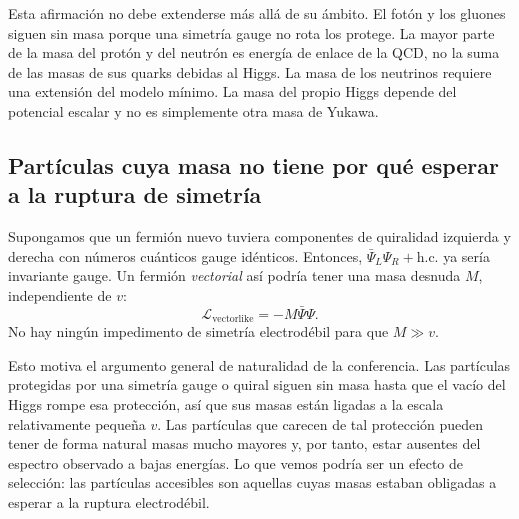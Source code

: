 Esta afirmación no debe extenderse más allá de su ámbito. El fotón y los gluones siguen sin masa porque una simetría gauge no rota los protege. La mayor parte de la masa del protón y del neutrón es energía de enlace de la QCD, no la suma de las masas de sus quarks debidas al Higgs. La masa de los neutrinos requiere una extensión del modelo mínimo. La masa del propio Higgs depende del potencial escalar y no es simplemente otra masa de Yukawa.

\subsection{Partículas cuya masa no tiene por qué esperar a la ruptura de simetría}

Supongamos que un fermión nuevo tuviera componentes de quiralidad izquierda y derecha con números cuánticos gauge idénticos. Entonces,
\(\bar\Psi_L\Psi_R+\mathrm{h.c.}\) ya sería invariante gauge. Un fermión \emph{vectorial} así podría tener una masa desnuda \(M\), independiente de
\(v\):
\begin{equation}
  \mathcal L_{\mathrm{vectorlike}}
  =-M\bar\Psi\Psi.
  \label{eq:l09-vectorlike-mass}
\end{equation}
No hay ningún impedimento de simetría electrodébil para que \(M\gg v\).

Esto motiva el argumento general de naturalidad de la conferencia. Las partículas protegidas por una simetría gauge o quiral siguen sin masa hasta que el vacío del Higgs rompe esa protección, así que sus masas están ligadas a la escala relativamente pequeña \(v\). Las partículas que carecen de tal protección pueden tener de forma natural masas mucho mayores y, por tanto, estar ausentes del espectro observado a bajas energías. Lo que vemos podría ser un efecto de selección: las partículas accesibles son aquellas cuyas masas estaban obligadas a esperar a la ruptura electrodébil.

\begin{classroomqa}
\end{classroomqa}

